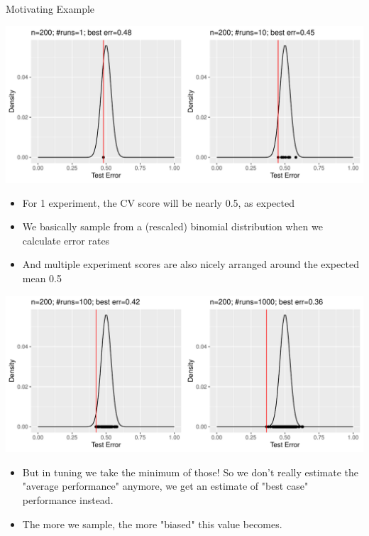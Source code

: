 \begin{frame}[c,allowframebreaks]{Motivating Example}
    \begin{center}
        \includegraphics[height=.6\textheight]{dist-tuning1}
    \end{center}

    \begin{itemize}
    \item For 1 experiment, the CV score will be nearly 0.5, as expected
    \item We basically sample from a (rescaled) binomial distribution when we calculate error rates
    \item And multiple experiment scores are also nicely arranged around the expected mean 0.5
    \end{itemize}

    \framebreak

    \begin{center}
        \includegraphics[height=.6\textheight]{dist-tuning2}
    \end{center}

    \begin{itemize}
    \item But in tuning we take the minimum of those! So we don't really estimate the "average performance" anymore, we get an estimate of "best case" performance instead.
    \item The more we sample, the more "biased" this value becomes. 
    \end{itemize}
    \end{frame}

